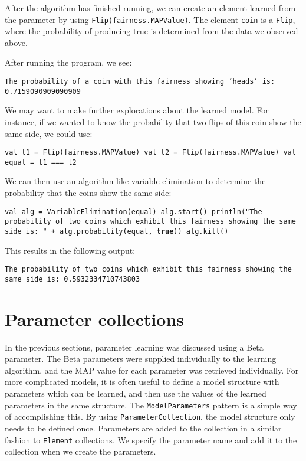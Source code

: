 After the algorithm has finished running, we can create an element learned from the parameter by using \texttt{Flip(fairness.MAPValue)}. The element \texttt{coin} is a \texttt{Flip}, where the probability of producing true is determined from the data we observed above.

After running the program, we see:

\begin{flushleft}
\texttt{The probability of a coin with this fairness showing 'heads' is:
0.7159090909090909}
\end{flushleft}

We may want to make further explorations about the learned model. For instance, if we wanted to know the probability that two flips of this coin show the same side, we could use:

\begin{flushleft}
\texttt{val t1 = Flip(fairness.MAPValue) 
\newline val t2 = Flip(fairness.MAPValue) 
\newline val equal = t1 === t2}
\end{flushleft}

We can then use an algorithm like variable elimination to determine the probability that the coins show the same side:

\begin{flushleft}
\texttt{val alg = VariableElimination(equal)
\newline alg.start()
\newline println("The probability of two coins which exhibit this fairness showing the same side is: " + alg.probability(equal, \textbf{true}))
\newline alg.kill()
}
\end{flushleft}

This results in the following output:

\begin{flushleft}
\texttt{The probability of two coins which exhibit this fairness showing the same side is: 0.5932334710743803}
\end{flushleft}

\section{Parameter collections}

In the previous sections, parameter learning was discussed using a Beta parameter. The Beta parameters were supplied individually to the learning algorithm, and the MAP value for each parameter was retrieved individually. For more complicated models, it is often useful to define a model structure with parameters which can be learned, and then use the values of the learned parameters in the same structure. The \texttt{ModelParameters} pattern is a simple way of accomplishing this. By using \texttt{ParameterCollection}, the model structure only needs to be defined once. Parameters are added to the collection in a similar fashion to \texttt{Element} collections. We specify the parameter name and add it to the collection when we create the parameters.

